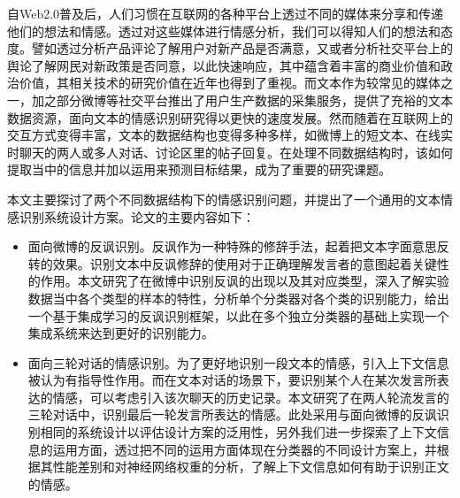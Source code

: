 \begin{cabstract}

自Web2.0普及后，人们习惯在互联网的各种平台上透过不同的媒体来分享和传递他们的想法和情感。透过对这些媒体进行情感分析，我们可以得知人们的想法和态度。譬如透过分析产品评论了解用户对新产品是否满意，又或者分析社交平台上的舆论了解网民对新政策是否同意，以此快速响应，其中蕴含着丰富的商业价值和政治价值，其相关技术的研究价值在近年也得到了重视。而文本作为较常见的媒体之一，加之部分微博等社交平台推出了用户生产数据的采集服务，提供了充裕的文本数据资源，面向文本的情感识别研究得以更快的速度发展。然而随着在互联网上的交互方式变得丰富，文本的数据结构也变得多种多样，如微博上的短文本、在线实时聊天的两人或多人对话、讨论区里的帖子回复。在处理不同数据结构时，该如何提取当中的信息并加以运用来预测目标结果，成为了重要的研究课题。

  本文主要探讨了两个不同数据结构下的情感识别问题，并提出了一个通用的文本情感识别系统设计方案。论文的主要内容如下：

  \begin{itemize}

  \item 面向微博的反讽识别。反讽作为一种特殊的修辞手法，起着把文本字面意思反转的效果。识别文本中反讽修辞的使用对于正确理解发言者的意图起着关键性的作用。本文研究了在微博中识别反讽的出现以及其对应类型，深入了解实验数据当中各个类型的样本的特性，分析单个分类器对各个类的识别能力，给出一个基于集成学习的反讽识别框架，以此在多个独立分类器的基础上实现一个集成系统来达到更好的识别能力。

  \item 面向三轮对话的情感识别。为了更好地识别一段文本的情感，引入上下文信息被认为有指导性作用。而在文本对话的场景下，要识别某个人在某次发言所表达的情感，可以考虑引入该次聊天的历史记录。本文研究了在两人轮流发言的三轮对话中，识别最后一轮发言所表达的情感。此处采用与面向微博的反讽识别相同的系统设计以评估设计方案的泛用性，另外我们进一步探索了上下文信息的运用方面，透过把不同的运用方面体现在分类器的不同设计方案上，并根据其性能差别和对神经网络权重的分析，了解上下文信息如何有助于识别正文的情感。
  \end{itemize}


\end{cabstract}


